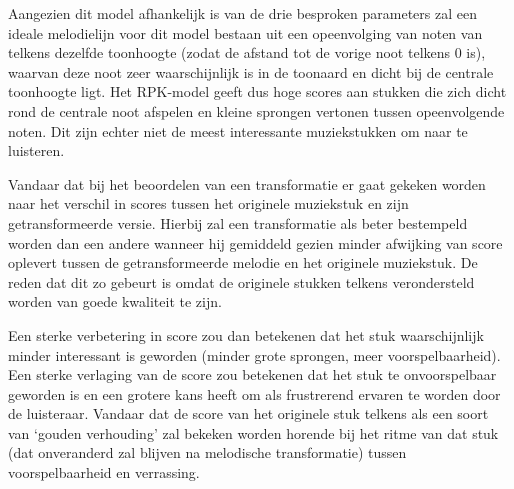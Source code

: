 Aangezien dit model afhankelijk is van de drie besproken parameters zal een ideale melodielijn voor dit model bestaan uit een opeenvolging van noten van telkens dezelfde toonhoogte (zodat de afstand tot de vorige noot telkens 0 is), waarvan deze noot zeer waarschijnlijk is in de toonaard en dicht bij de centrale toonhoogte ligt. Het RPK-model geeft dus hoge scores aan stukken die zich dicht rond de centrale noot afspelen en kleine sprongen vertonen tussen opeenvolgende noten. Dit zijn echter niet de meest interessante muziekstukken om naar te luisteren. 

Vandaar dat bij het beoordelen van een transformatie er gaat gekeken worden naar het verschil in scores tussen het originele muziekstuk en zijn getransformeerde versie. Hierbij zal een transformatie als beter bestempeld worden dan een andere wanneer hij gemiddeld gezien minder afwijking van score oplevert tussen de getransformeerde melodie en het originele muziekstuk. De reden dat dit zo gebeurt is omdat de originele stukken telkens verondersteld worden van goede kwaliteit te zijn. 

Een sterke verbetering in score zou dan betekenen dat het stuk waarschijnlijk minder interessant is geworden (minder grote sprongen, meer voorspelbaarheid). Een sterke verlaging van de score zou betekenen dat het stuk te onvoorspelbaar geworden is en een grotere kans heeft om als frustrerend ervaren te worden door de luisteraar. Vandaar dat de score van het originele stuk telkens als een soort van `gouden verhouding' zal bekeken worden horende bij het ritme van dat stuk (dat onveranderd zal blijven na melodische transformatie) tussen voorspelbaarheid en verrassing.  


